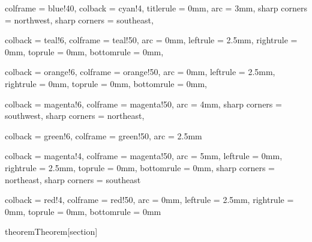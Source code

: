 
{
    colframe = blue!40,
    colback = cyan!4,
    titlerule = 0mm,
    arc = 3mm,
    sharp corners = northwest, 
    sharp corners = southeast,
}

{
    colback = teal!6,
    colframe = teal!50,
    arc = 0mm,
    leftrule = 2.5mm,
    rightrule = 0mm,
    toprule = 0mm,
    bottomrule = 0mm,
}

{
    colback = orange!6,
    colframe = orange!50,
    arc = 0mm,
    leftrule = 2.5mm,
    rightrule = 0mm,
    toprule = 0mm,
    bottomrule = 0mm,
}

{
    colback = magenta!6,
    colframe = magenta!50,
    arc = 4mm,
    sharp corners = southwest,
    sharp corners = northeast,
}

{
    colback = green!6,
    colframe = green!50,
    arc = 2.5mm
}

{
    colback = magenta!4,
    colframe = magenta!50,
    arc = 5mm,
    leftrule = 0mm,
    rightrule = 2.5mm,
    toprule = 0mm,
    bottomrule = 0mm,
    sharp corners = northeast,
    sharp corners = southeast
}

{
  colback = red!4,
  colframe = red!50,
  arc = 0mm,
  leftrule = 2.5mm,
  rightrule = 0mm,
  toprule = 0mm,
  bottomrule = 0mm
}

\newenvironment{soln}
{
    \vspace{0.1cm}
    \textit{Solution.}
}{$\hfill \blacksquare$}

\newenvironment{soln-container}
{
    \vspace{0.1cm}
}

\newtheorem{theorem}{Theorem}[section]
\newtheorem{corollary}{Corollary}[theorem]
\newtheorem{clm}[theorem]{Claim}

\theoremstyle{remark}
\newtheorem{examples}{Example}[theorem]

\theoremstyle{definition}
\newtheorem{prob}{Problem}
\newtheorem{definition}{Definition}[section]

